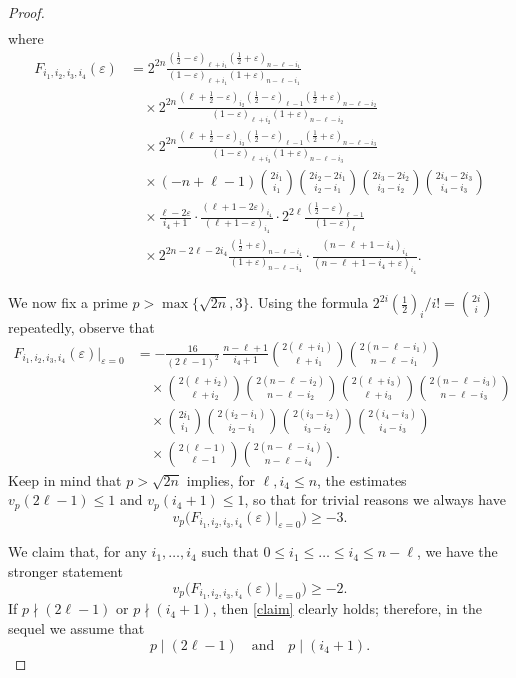 \documentclass[12pt]{article}
\let\le\leqslant
\let\ge\geqslant
\let\eps\varepsilon
\theoremstyle{remark}
\numberwithin{equation}{section}
\begin{document}
\begin{proof}
\begin{align*}
\end{align*}
where
\begin{align*}
F_{i_1,i_2,i_3,i_4}(\eps)
&=2^{2n}  \frac{(\frac12-\eps)_{\ell+i_1}(\frac12+\eps)_{n-\ell-i_1}}{(1-\eps)_{\ell+i_1}(1+\eps)_{n-\ell-i_1}} \\ &\quad
\times2^{2n} \frac{(\ell+\frac12-\eps)_{i_2}(\frac12-\eps)_{\ell-1}(\frac12+\eps)_{n-\ell-i_2}}{(1-\eps)_{\ell+i_2}(1+\eps)_{n-\ell-i_2}} \\ &\quad
\times2^{2n} \frac{(\ell+\frac12-\eps)_{i_3}(\frac12-\eps)_{\ell-1}(\frac12+\eps)_{n-\ell-i_3}}{(1-\eps)_{\ell+i_3}(1+\eps)_{n-\ell-i_3}} \\ &\quad
\times (-n+\ell-1)\binom{2i_1}{i_1} \binom{2i_2-2i_1}{i_2-i_1}\binom{2i_3-2i_2}{i_3-i_2}\binom{2i_4-2i_3}{i_4-i_3}
\\ &\quad
\times \frac{\ell-2\eps}{i_4+1} \cdot \frac{(\ell+1-2\eps)_{i_4}}{(\ell+1-\eps)_{i_4}}
\cdot 2^{2\ell} \frac{(\frac12-\eps)_{\ell-1}}{(1-\eps)_{\ell}}
\\ &\quad
\times 2^{2n-2\ell-2i_4} \frac{(\frac12+\eps)_{n-\ell-i_4}}{(1+\eps)_{n-\ell-i_4}}
\cdot\frac{(n-\ell+1-i_4)_{i_4}}{(n-\ell+1-i_4+\eps)_{i_4}}.
\end{align*}

We now fix a prime $p>\max\{\sqrt{2n},3\}$. Using the formula $2^{2i} \left(\frac{1}{2}\right)_i/i!=\binom{2i}{i}$ repeatedly, observe that
\begin{align*}
F_{i_1,i_2,i_3,i_4}(\eps) |_{\eps = 0}
&=-\frac{16}{(2\ell-1)^2} \, \frac{n-\ell+1}{i_4+1}
\binom{2(\ell+i_1)}{\ell+i_1}\binom{2(n-\ell-i_1)}{n-\ell-i_1}
\\ &\quad
\times \binom{2(\ell+i_2)}{\ell+i_2}\binom{2(n-\ell-i_2)}{n-\ell-i_2}
\binom{2(\ell+i_3)}{\ell+i_3}\binom{2(n-\ell-i_3)}{n-\ell-i_3}
\\ &\quad
\times \binom{2i_1}{i_1}\binom{2(i_2-i_1)}{i_2-i_1}\binom{2(i_3-i_2)}{i_3-i_2} \binom{2(i_4-i_3)}{i_4-i_3}
\\ &\quad
\times \binom{2(\ell-1)}{\ell-1}\binom{2(n-\ell-i_4)}{n-\ell-i_4}.
\end{align*}
Keep in mind that $p>\sqrt{2n}$ implies, for $\ell,i_4\le n$, the estimates $v_p(2\ell -1)\le 1$ and $v_p(i_4+1)\le 1$, so that for trivial reasons we always have
\[
v_p\big(  F_{i_1,i_2,i_3,i_4}(\eps) |_{\eps = 0} \big) \ge -3.
\]

We claim that, for any $i_1,\dots,i_4$ such that $0 \le i_1 \le \dots \le i_4 \le n-\ell$, we have the stronger statement
\begin{equation}
\label{claim}
v_p\big(  F_{i_1,i_2,i_3,i_4}(\eps) |_{\eps = 0} \big) \ge -2.
\end{equation}
If $p \nmid (2\ell-1)$ or $p \nmid (i_4+1)$, then \eqref{claim} clearly holds; therefore, in the sequel we assume that
\[
p \mid (2\ell-1) \quad\text{and}\quad  p \mid (i_4+1).
\] 


\end{proof}
\end{document}
